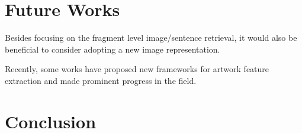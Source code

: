 \section{Future Works}
Besides focusing on the fragment level image/sentence retrieval, it would also be beneficial to consider adopting a new image representation. 

Recently, some works \cite{TranslatingArtworks,parttowhole,Art2Real} have proposed new frameworks for artwork feature extraction and made prominent progress in the field. 


\section{Conclusion}


